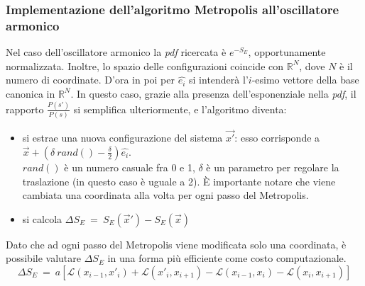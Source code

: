 \subsubsection{Implementazione dell'algoritmo Metropolis all'oscillatore armonico}
Nel caso dell'oscillatore armonico la \emph{pdf} ricercata è $ e^{-S_E}$, opportunamente normalizzata.
Inoltre, lo spazio delle configurazioni coincide con $\mathbb{R}^N$, dove $N$ è il numero di coordinate. D'ora in poi per $\hat{e_i}$ si intenderà l'$i$-esimo vettore
della base canonica in $\mathbb{R}^N$.
In questo caso, grazie alla presenza dell'esponenziale nella \emph{pdf},
il rapporto $ \frac{P(s')}{P(s)}$ si semplifica ulteriormente, e l'algoritmo diventa:
\begin{itemize}
 \item si estrae una nuova configurazione del sistema $\vec{x'}$: esso corrisponde a $\vec{x} + \left(\delta \ rand() - \frac{\delta}{2}\right)\hat{e_i}$.
  \\
  $rand()$ è un numero casuale fra 0 e 1, $\delta$ è un parametro per regolare la traslazione (in questo caso è uguale a 2).
  È importante notare che viene cambiata una coordinata alla volta per ogni passo del Metropolis.
 \item si calcola $\Delta S_E \ = \ S_E(\vec{x}') -S_E(\vec{x})$
\end{itemize}
Dato che ad ogni passo del Metropolis viene modificata solo una coordinata, è possibile valutare $\Delta S_E$ in una forma più efficiente come costo computazionale.
\begin{equation*}
\Delta S_E \ = \ a[\mathcal{L}(x_{i-1},x'_{i})+\mathcal{L}(x'_{i},x_{i+1})-\mathcal{L}(x_{i-1},x_{i})-\mathcal{L}(x_{i},x_{i+1})]    
\end{equation*}
